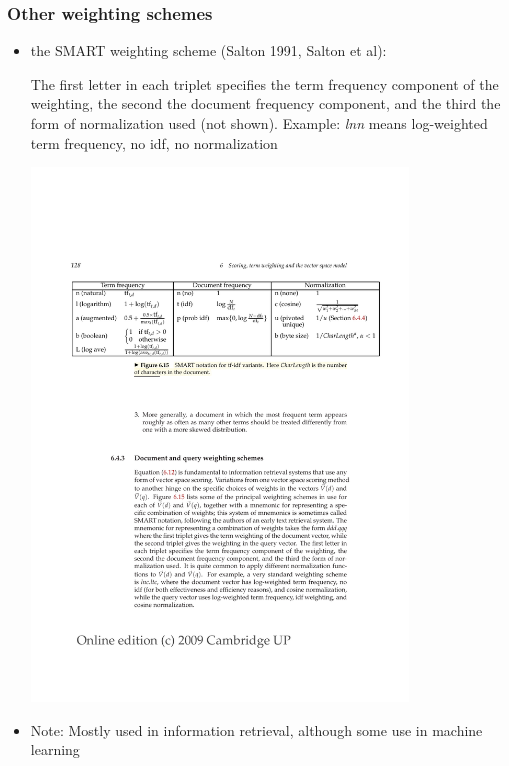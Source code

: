 \documentclass[11pt,handout]{beamer}
\begin{document}
\begin{frame}
 \frametitle{Other weighting schemes}
 \begin{itemize}
  \item the SMART weighting scheme (Salton 1991, Salton et
        al):\newline
        \begin{small}The first letter in each triplet specifies the term frequency
         component of the weighting, the second the document frequency
         component, and the third the form of normalization used (not
         shown).  Example: \emph{lnn} means log-weighted term frequency, no idf, no
         normalization
        \end{small}
        \begin{center}
         \includegraphics[width=10cm]{SMARTweightingscheme.pdf}
        \end{center}
  \item Note: Mostly used in information retrieval, although some use in
        machine learning
 \end{itemize}
\end{frame}
\end{document}
